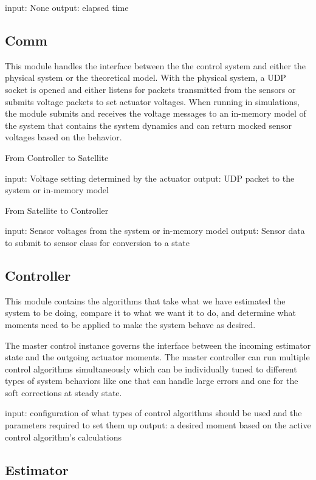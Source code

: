     input: None
    output: elapsed time

\subsection{Comm}
\label{subsec:Comm}


This module handles the interface between the the control system and either the physical system or the theoretical model. With the physical system, a UDP socket is opened and either listens for packets transmitted from the sensors or submits voltage packets to set actuator voltages. When running in simulations, the module submits and receives the voltage messages to an in-memory model of the system that contains the system dynamics and can return mocked sensor voltages based on the behavior.

From Controller to Satellite

    input: Voltage setting determined by the actuator
    output: UDP packet to the system or in-memory model

From Satellite to Controller

    input: Sensor voltages from the system or in-memory model
    output: Sensor data to submit to sensor class for conversion to a state

\subsection{Controller}
\label{subsec:Controller}


This module contains the algorithms that take what we have estimated the system to be doing, compare it to what we want it to do, and determine what moments need to be applied to make the system behave as desired.

The master control instance governs the interface between the incoming estimator state and the outgoing actuator moments. The master controller can run multiple control algorithms simultaneously which can be individually tuned to different types of system behaviors like one that can handle large errors and one for the soft corrections at steady state.

    input: configuration of what types of control algorithms should be used and the parameters required to set them up
    output: a desired moment based on the active control algorithm's calculations

\subsection{Estimator}
\label{subsec:Estimator}


